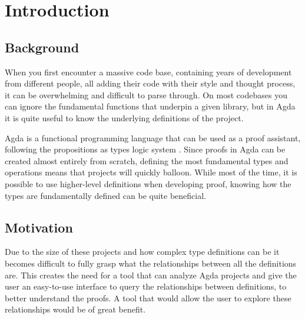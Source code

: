
\chapter{Introduction}


\section{Background}

When you first encounter a massive code base, containing years of development
from different people, all adding their code with their style and
thought process, it can be overwhelming and difficult to parse through. On most
codebases you can ignore the fundamental functions that underpin a given
library, but in Agda it is quite useful to know the underlying
definitions of the project. 

Agda is a functional programming language that can be used as a proof
assistant, following the propositions as types logic system \cite{agda_docs}.
Since proofs in Agda can be created almost entirely from scratch, defining the
most fundamental types and operations means that projects will
quickly balloon. While most of the time, it is possible to use higher-level definitions when developing proof, knowing how the types are
fundamentally defined can be quite beneficial. 

\section{Motivation}

Due to the size of these projects and how complex type definitions can be it
becomes difficult to fully grasp what the relationships between all the
definitions are. This creates the need for a tool that can analyze Agda
projects and give the user an easy-to-use interface to query the relationships
between definitions, to better understand the proofs. A tool that
would allow the user to explore these relationships would be of great benefit.


